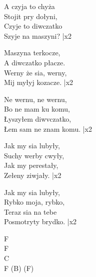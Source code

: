 \begin{text}
    A czyja to chyża\\
    Stojit pry dołyni,\\
    \vin Czyje to diwczatko\\
    \vin Szyje na maszyni? |x2

    Maszyna terkocze,\\
    A diwczatko płacze.\\
    \vin Werny że sia, werny,\\
    \vin Mij myłyj kozacze. |x2

    Ne wernu, ne wernu,\\
    Bo ne mam ku komu,\\
    \vin Łyszyłem diwvczatko,\\
    \vin Łem sam ne znam komu. |x2

    Jak my sia lubyły,\\
    Suchy werby cwyły,\\
    \vin Jak my perestały,\\
    \vin Zełeny ziwjały. |x2

    Jak my sia lubyły,\\
    Rybko moja, rybko,\\
    \vin Teraz sia na tebe\\
    \vin Posmotryty brydko. |x2
\end{text}
\begin{chord}
    F\\
    F\\
    C\\
    F (B) (F)
\end{chord}